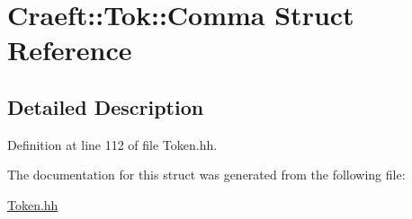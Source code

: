 \hypertarget{struct_craeft_1_1_tok_1_1_comma}{}\section{Craeft\+:\+:Tok\+:\+:Comma Struct Reference}
\label{struct_craeft_1_1_tok_1_1_comma}


\subsection{Detailed Description}


Definition at line 112 of file Token.\+hh.



The documentation for this struct was generated from the following file\+:\begin{DoxyCompactItemize}
\item 
\hyperlink{_token_8hh}{Token.\+hh}\end{DoxyCompactItemize}
